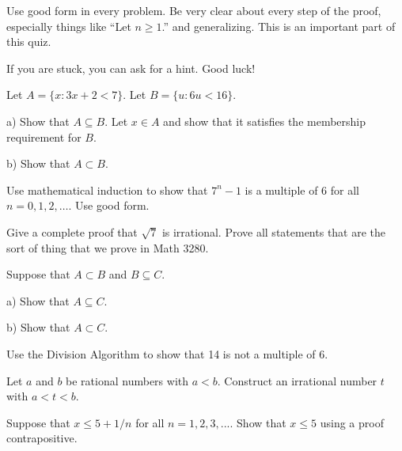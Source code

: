 \yourname


\noindent
Use good form in every problem.
Be very clear about every step of the proof, especially things like ``Let $n \geq 1$.'' and generalizing.
This is an important part of this quiz.

\noindent
If you are stuck, you can ask for a hint.
Good luck!

\vspace{0.2in}

\blist{3.5in}
\item Let $A=\{ x : 3x+2 < 7 \}.$  
Let $B=\{u : 6u < 16\}.$

a) Show that $A \subseteq B$.
Let $x \in A$ and show that it satisfies the membership requirement for $B$.

\vspace*{2.5in}

b) Show that $A \subset B$.

\vspace*{-2.5in}


\item
Use mathematical induction to show that $7^n - 1$ is a multiple of 6 for all $n = 0, 1, 2, \ldots$.
Use good form.

\item
Give a complete proof that $\sqrt{7}$ is irrational.
Prove all statements that are the sort of thing that we prove in Math 3280.

\vspace*{1.5in}

\item Suppose that $A \subset B$ and $B \subseteq C$.

a) Show that $A \subseteq C$.

b) Show that $A \subset C$.
 
\item Use the Division Algorithm to show that 14 is not a multiple of 6.
 
\item Let $a$ and $b$ be rational numbers with $a<b$.
Construct an irrational number $t$ with $a<t<b$.
 
\pagebreak
 
\item
Suppose that $x \leq 5 + 1/n$ for all $n = 1, 2, 3, . . ..$
Show that $x \leq 5$ using a proof contrapositive.

\elist
